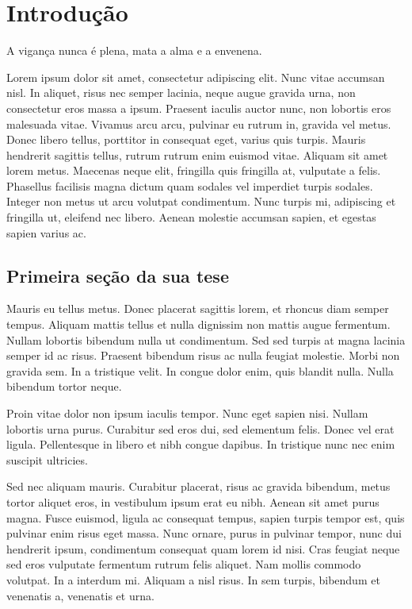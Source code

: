 \chapter{Introdu\c{c}\~ao}
\label{chap:intro}

\begin{epigrafe}
	A vigan\c{c}a nunca \'e plena, mata a alma e a envenena.
	
\end{epigrafe}

Lorem ipsum dolor sit amet, consectetur adipiscing elit. Nunc vitae
accumsan nisl. In aliquet, risus nec semper lacinia, neque augue
gravida urna, non consectetur eros massa a ipsum. Praesent iaculis
auctor nunc, non lobortis eros malesuada vitae. Vivamus arcu arcu,
pulvinar eu rutrum in, gravida vel metus. Donec libero tellus,
porttitor in consequat eget, varius quis turpis. Mauris hendrerit
sagittis tellus, rutrum rutrum enim euismod vitae. Aliquam sit amet
lorem metus. Maecenas neque elit, fringilla quis fringilla at,
vulputate a felis. Phasellus facilisis magna dictum quam sodales vel
imperdiet turpis sodales. Integer non metus ut arcu volutpat
condimentum. Nunc turpis mi, adipiscing et fringilla ut, eleifend nec
libero. Aenean molestie accumsan sapien, et egestas sapien varius ac.


\section{Primeira se\c{c}\~ao da sua tese}

Mauris eu tellus metus. Donec placerat sagittis lorem, et rhoncus diam
semper tempus. Aliquam mattis tellus et nulla dignissim non mattis
augue fermentum. Nullam lobortis bibendum nulla ut condimentum. Sed
sed turpis at magna lacinia semper id ac risus. Praesent bibendum
risus ac nulla feugiat molestie. Morbi non gravida sem. In a tristique
velit. In congue dolor enim, quis blandit nulla. Nulla bibendum tortor
neque.

Proin vitae dolor non ipsum iaculis tempor. Nunc eget sapien
nisi. Nullam lobortis urna purus. Curabitur sed eros dui, sed
elementum felis. Donec vel erat ligula. Pellentesque in libero et nibh
congue dapibus. In tristique nunc nec enim suscipit ultricies.

Sed nec aliquam mauris. Curabitur placerat, risus ac gravida bibendum,
metus tortor aliquet eros, in vestibulum ipsum erat eu nibh. Aenean
sit amet purus magna. Fusce euismod, ligula ac consequat tempus,
sapien turpis tempor est, quis pulvinar enim risus eget massa. Nunc
ornare, purus in pulvinar tempor, nunc dui hendrerit ipsum,
condimentum consequat quam lorem id nisi. Cras feugiat neque sed eros
vulputate fermentum rutrum felis aliquet. Nam mollis commodo
volutpat. In a interdum mi. Aliquam a nisl risus. In sem turpis,
bibendum et venenatis a, venenatis et urna.

